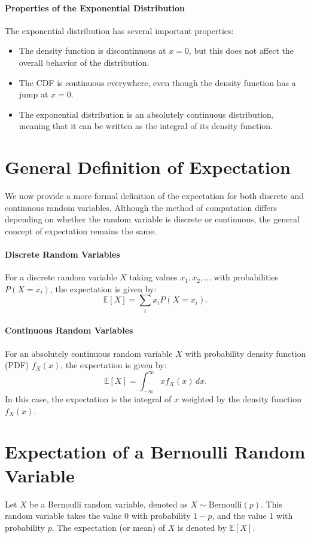     \paragraph{Properties of the Exponential Distribution}
    The exponential distribution has several important properties:
    \begin{itemize}
        \item The density function is discontinuous at $x = 0$, but this does not affect the overall behavior of the distribution.
        \item The CDF is continuous everywhere, even though the density function has a jump at $x = 0$.
        \item The exponential distribution is an absolutely continuous distribution, meaning that it can be written as the integral of its density function.
    \end{itemize}

    \section{General Definition of Expectation}
    We now provide a more formal definition of the expectation for both discrete and continuous random variables. Although the method of computation differs depending on whether the random variable is discrete or continuous, the general concept of expectation remains the same.
    
    \paragraph{Discrete Random Variables}
    For a discrete random variable $X$ taking values $x_1, x_2, \dots$ with probabilities $P(X = x_i)$, the expectation is given by:
    \[
    \mathbb{E}[X] = \sum_{i} x_i P(X = x_i).
    \]
    
    \paragraph{Continuous Random Variables}
    For an absolutely continuous random variable $X$ with probability density function (PDF) $f_X(x)$, the expectation is given by:
    \[
    \mathbb{E}[X] = \int_{-\infty}^{\infty} x f_X(x) \, dx.
    \]
    In this case, the expectation is the integral of $x$ weighted by the density function $f_X(x)$.
    
    \section{Expectation of a Bernoulli Random Variable}
    Let $X$ be a Bernoulli random variable, denoted as $X \sim \text{Bernoulli}(p)$. This random variable takes the value 0 with probability $1 - p$, and the value 1 with probability $p$. The expectation (or mean) of $X$ is denoted by $\mathbb{E}[X]$.
    

